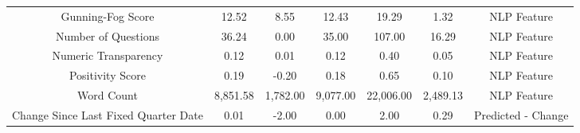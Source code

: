 \begin{longtable}{ccccccc}
Gunning-Fog Score & 12.52 & 8.55 & 12.43 & 19.29 & 1.32 & NLP Feature \\
Number of Questions & 36.24 & 0.00 & 35.00 & 107.00 & 16.29 & NLP Feature \\
Numeric Transparency & 0.12 & 0.01 & 0.12 & 0.40 & 0.05 & NLP Feature \\
Positivity Score & 0.19 & -0.20 & 0.18 & 0.65 & 0.10 & NLP Feature \\
Word Count & 8,851.58 & 1,782.00 & 9,077.00 & 22,006.00 & 2,489.13 & NLP Feature \\
Change Since Last Fixed Quarter Date & 0.01 & -2.00 & 0.00 & 2.00 & 0.29 & Predicted - Change \\
\end{longtable}

\normalsize